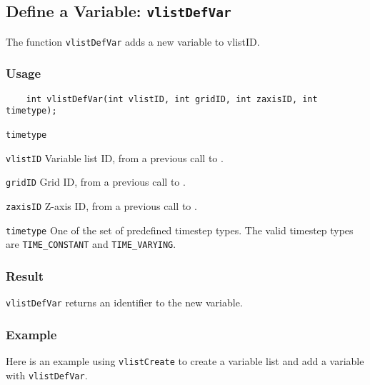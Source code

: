 

\subsection{Define a Variable: \texttt{vlistDefVar}}
\label{vlistDefVar}

The function {\texttt{vlistDefVar}} adds a new variable to vlistID.

\subsubsection*{Usage}

\begin{verbatim}
    int vlistDefVar(int vlistID, int gridID, int zaxisID, int timetype);
\end{verbatim}

\hspace*{4mm}\begin{minipage}[]{15cm}
\begin{deflist}{\texttt{timetype}\ }
\item[\texttt{vlistID}]
Variable list ID, from a previous call to {}.
\item[\texttt{gridID}]
Grid ID, from a previous call to {}.
\item[\texttt{zaxisID}]
Z-axis ID, from a previous call to {}.
\item[\texttt{timetype}]
One of the set of predefined {\CDI} timestep types.
                     The valid {\CDI} timestep types are {\texttt{TIME\_CONSTANT}} and {\texttt{TIME\_VARYING}}.

\end{deflist}
\end{minipage}

\subsubsection*{Result}

{\texttt{vlistDefVar}} returns an identifier to the new variable.


\subsubsection*{Example}

Here is an example using {\texttt{vlistCreate}} to create a variable list
and add a variable with {\texttt{vlistDefVar}}.

